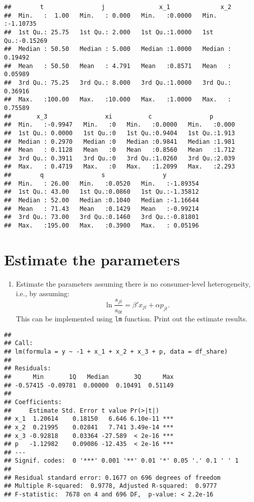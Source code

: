 \documentclass[
]{book}
\providecommand{\tightlist}{%
  \setlength{\itemsep}{0pt}\setlength{\parskip}{0pt}}
\begin{document}
\begin{verbatim}
##        t                j               x_1              x_2          
##  Min.   :  1.00   Min.   : 0.000   Min.   :0.0000   Min.   :-1.10735  
##  1st Qu.: 25.75   1st Qu.: 2.000   1st Qu.:1.0000   1st Qu.:-0.15269  
##  Median : 50.50   Median : 5.000   Median :1.0000   Median : 0.19492  
##  Mean   : 50.50   Mean   : 4.791   Mean   :0.8571   Mean   : 0.05989  
##  3rd Qu.: 75.25   3rd Qu.: 8.000   3rd Qu.:1.0000   3rd Qu.: 0.36916  
##  Max.   :100.00   Max.   :10.000   Max.   :1.0000   Max.   : 0.75589  
##       x_3                xi          c                p        
##  Min.   :-0.9947   Min.   :0   Min.   :0.0000   Min.   :0.000  
##  1st Qu.: 0.0000   1st Qu.:0   1st Qu.:0.9404   1st Qu.:1.913  
##  Median : 0.2970   Median :0   Median :0.9841   Median :1.981  
##  Mean   : 0.1128   Mean   :0   Mean   :0.8560   Mean   :1.712  
##  3rd Qu.: 0.3911   3rd Qu.:0   3rd Qu.:1.0260   3rd Qu.:2.039  
##  Max.   : 0.4719   Max.   :0   Max.   :1.2099   Max.   :2.293  
##        q                s                y           
##  Min.   : 26.00   Min.   :0.0520   Min.   :-1.89354  
##  1st Qu.: 43.00   1st Qu.:0.0860   1st Qu.:-1.35812  
##  Median : 52.00   Median :0.1040   Median :-1.16644  
##  Mean   : 71.43   Mean   :0.1429   Mean   :-0.99214  
##  3rd Qu.: 73.00   3rd Qu.:0.1460   3rd Qu.:-0.81801  
##  Max.   :195.00   Max.   :0.3900   Max.   : 0.05196
\end{verbatim}

\hypertarget{estimate-the-parameters-1}{%
\section{Estimate the parameters}\label{estimate-the-parameters-1}}

\begin{enumerate}
\def\labelenumi{\arabic{enumi}.}
\tightlist
\item
  Estimate the parameters assuming there is no consumer-level heterogeneity, i.e., by assuming:
  \[
  \ln \frac{s_{jt}}{s_{0t}} = \beta' x_{jt} + \alpha p_{jt}.
  \]
  This can be implemented using \texttt{lm} function. Print out the estimate results.
\end{enumerate}

\begin{verbatim}
## 
## Call:
## lm(formula = y ~ -1 + x_1 + x_2 + x_3 + p, data = df_share)
## 
## Residuals:
##      Min       1Q   Median       3Q      Max 
## -0.57415 -0.09781  0.00000  0.10491  0.51149 
## 
## Coefficients:
##     Estimate Std. Error t value Pr(>|t|)    
## x_1  1.20614    0.18150   6.646 6.10e-11 ***
## x_2  0.21995    0.02841   7.741 3.49e-14 ***
## x_3 -0.92818    0.03364 -27.589  < 2e-16 ***
## p   -1.12982    0.09086 -12.435  < 2e-16 ***
## ---
## Signif. codes:  0 '***' 0.001 '**' 0.01 '*' 0.05 '.' 0.1 ' ' 1
## 
## Residual standard error: 0.1677 on 696 degrees of freedom
## Multiple R-squared:  0.9778, Adjusted R-squared:  0.9777 
## F-statistic:  7678 on 4 and 696 DF,  p-value: < 2.2e-16
\end{verbatim}
\end{document}
